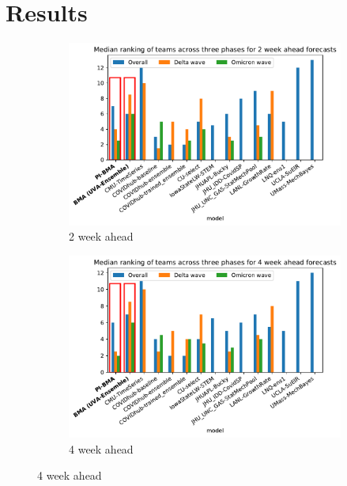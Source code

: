 \documentclass[conference,compsoc]{IEEEtran}
\begin{document}
\section{Results}
\begin{figure}[ht!]
    \centering
    \begin{subfigure}{.47\textwidth}
    \includegraphics[width=.99\textwidth]{figs/pred_PI_BMA_2_wk_median_rank_various_weeks_seq_v2.pdf}
    \caption{2 week ahead}
    \label{fig:2wk_ranking}
    \end{subfigure}
    \begin{subfigure}{.47\textwidth}
      \includegraphics[width=.99\textwidth]{figs/pred_PI_BMA_4_wk_median_rank_various_weeks_seq_v2.pdf}
      \caption{4 week ahead}
      \label{fig:4wk_ranking}
     

\end{subfigure}
\end{figure}
\end{document}
